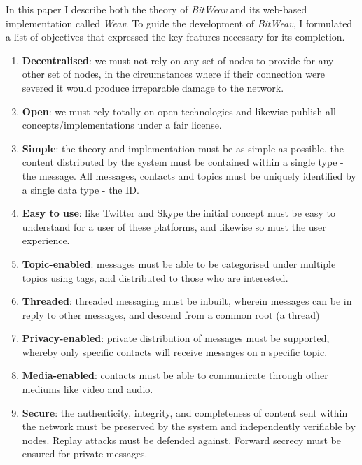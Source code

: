 \documentclass[10pt,a4paper,onecolumn]{article}
\begin{document}
In this paper I describe both the theory of \textit{BitWeav} and its web-based implementation called \textit{Weav}. To guide the development of \textit{BitWeav}, I formulated a list of objectives that expressed the key features necessary for its completion.
\begin{enumerate}
\item \textbf{Decentralised}: we must not rely on any set of nodes to provide for any other set of nodes, in the circumstances where if their connection were severed it would produce irreparable damage to the network. 

\item \textbf{Open}: we must rely totally on open technologies and likewise publish all concepts/implementations under a fair license.

\item \textbf{Simple}: the theory and implementation must be as simple as possible. the content distributed by the system must be contained within a single type - the message. All messages, contacts and topics must be uniquely identified by a single data type - the ID.

\item \textbf{Easy to use}: like Twitter and Skype the initial concept must be easy to understand for a user of these platforms, and likewise so must the user experience.

\item \textbf{Topic-enabled}: messages must be able to be categorised under multiple topics using tags, and distributed to those who are interested.

\item \textbf{Threaded}: threaded messaging must be inbuilt, wherein messages can be in reply to other messages, and descend from a common root (a thread)

\item \textbf{Privacy-enabled}: private distribution of messages must be supported, whereby only specific contacts will receive messages on a specific topic.

\item \textbf{Media-enabled}: contacts must be able to communicate through other mediums like video and audio. 

\item \textbf{Secure}: the authenticity, integrity, and completeness of content sent within the network must be preserved by the system and independently verifiable by nodes. Replay attacks must be defended against. Forward secrecy must be ensured for private messages.
\end{enumerate}
\end{document}
